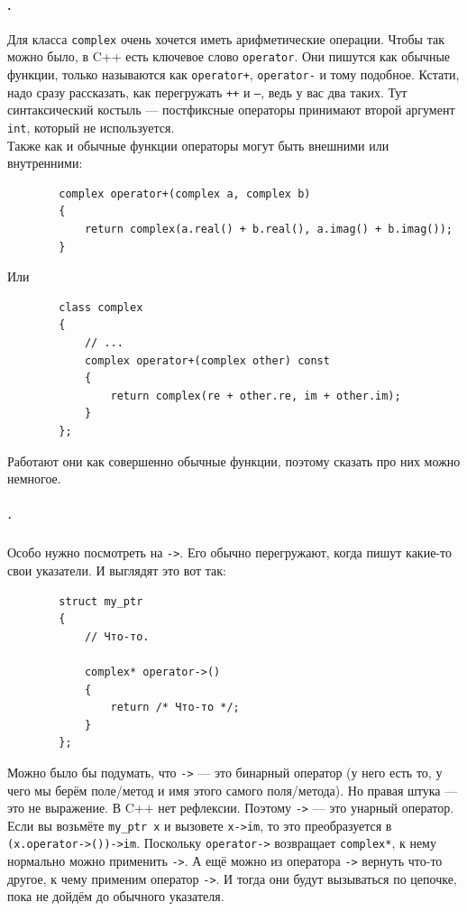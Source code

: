 \documentclass{article}
\begin{document}
    \paragraph{.}
    Для класса \texttt{complex} очень хочется иметь арифметические операции. Чтобы так можно было, в C++ есть ключевое слово \texttt{operator}. Они пишутся как обычные функции, только называются как \texttt{operator+}, \texttt{operator-} и тому подобное. Кстати, надо сразу рассказать, как перегружать \texttt{++} и \texttt{--}, ведь у вас два таких. Тут синтаксический костыль --- постфиксные операторы принимают второй аргумент \texttt{int}, который не используется.\\
    Также как и обычные функции операторы могут быть внешними или внутренними:
    \begin{verbatim}
        complex operator+(complex a, complex b)
        {
            return complex(a.real() + b.real(), a.imag() + b.imag());
        }
    \end{verbatim}
    Или
    \begin{verbatim}
        class complex
        {
            // ...
            complex operator+(complex other) const
            {
                return complex(re + other.re, im + other.im);
            }
        };
    \end{verbatim}
    Работают они как совершенно обычные функции, поэтому сказать про них можно немногое.
    \subparagraph{.}
    Особо нужно посмотреть на \texttt{->}. Его обычно перегружают, когда пишут какие-то свои указатели. И выглядят это вот так:
    \begin{verbatim}
        struct my_ptr
        {
            // Что-то.

            complex* operator->()
            {
                return /* Что-то */;
            }
        };
    \end{verbatim}
    Можно было бы подумать, что \texttt{->} --- это бинарный оператор (у него есть то, у чего мы берём поле/метод и имя этого самого поля/метода). Но правая штука --- это не выражение. В C++ нет рефлексии. Поэтому \texttt{->} --- это унарный оператор. Если вы возьмёте \texttt{my_ptr x} и вызовете \texttt{x->im}, то это преобразуется в \texttt{(x.operator->())->im}. Поскольку \texttt{operator->} возвращает \texttt{complex*}, к нему нормально можно применить \texttt{->}. А ещё можно из оператора \texttt{->} вернуть что-то другое, к чему применим оператор \texttt{->}. И тогда они будут вызываться по цепочке, пока не дойдём до обычного указателя.
\end{document}
